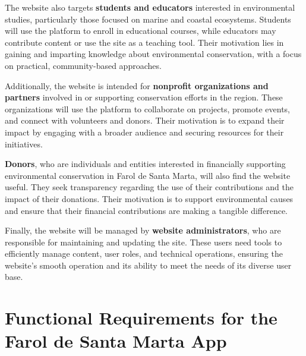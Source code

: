 The website also targets \textbf{students and educators} interested in environmental studies, particularly those focused on marine and coastal ecosystems. Students will use the platform to enroll in educational courses, while educators may contribute content or use the site as a teaching tool. Their motivation lies in gaining and imparting knowledge about environmental conservation, with a focus on practical, community-based approaches.

Additionally, the website is intended for \textbf{nonprofit organizations and partners} involved in or supporting conservation efforts in the region. These organizations will use the platform to collaborate on projects, promote events, and connect with volunteers and donors. Their motivation is to expand their impact by engaging with a broader audience and securing resources for their initiatives.

\textbf{Donors}, who are individuals and entities interested in financially supporting environmental conservation in Farol de Santa Marta, will also find the website useful. They seek transparency regarding the use of their contributions and the impact of their donations. Their motivation is to support environmental causes and ensure that their financial contributions are making a tangible difference.

Finally, the website will be managed by \textbf{website administrators}, who are responsible for maintaining and updating the site. These users need tools to efficiently manage content, user roles, and technical operations, ensuring the website's smooth operation and its ability to meet the needs of its diverse user base.

\newpage
\section*{Functional Requirements for the Farol de Santa Marta App}

